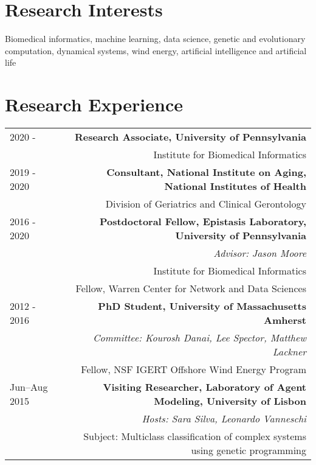 \section*{Research Interests}
Biomedical informatics, 
machine learning, 
data science, 
genetic and evolutionary computation,  
dynamical systems, 
wind energy, 
artificial intelligence and artificial life
 
\section*{Research Experience}

\begin{tabular}{L!{\VRule}R}
2020 - & {\bf Research Associate,  University of Pennsylvania} \\
& Institute for Biomedical Informatics \\
2019 - 2020  & {\bf Consultant, National Institute on Aging, National Institutes of Health} \\
& Division of Geriatrics and Clinical Gerontology \\
2016 - 2020 & {\bf Postdoctoral Fellow, Epistasis Laboratory, University of Pennsylvania} \\
& {\it Advisor: Jason Moore} \\
& Institute for Biomedical Informatics \\
& Fellow, Warren Center for Network and Data Sciences \\
2012 - 2016 & {\bf PhD Student, University of Massachusetts Amherst} \\
& {\it Committee: Kourosh Danai, Lee Spector, Matthew Lackner} \\
& Fellow, NSF IGERT Offshore Wind Energy Program \\
Jun--Aug 2015& {\bf Visiting Researcher, Laboratory of Agent Modeling, University of Lisbon} \\
&{\it Hosts: Sara Silva, Leonardo Vanneschi} \\
& Subject: Multiclass classification of complex systems using genetic programming \\

\end{tabular}
